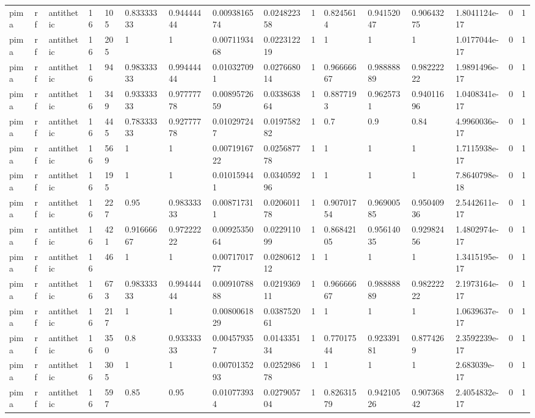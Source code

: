 \begin{tabular}{llllllllllllllll}
pima & rf & antithetic & 16 & 105 & 0.83333333 & 0.94444444 & 0.0093816574 & 0.024822358 & 1 & 0.8245614 & 0.94152047 & 0.90643275 & 1.8041124e-17 & 0 & 1 \\
pima & rf & antithetic & 16 & 205 & 1 & 1 & 0.0071193468 & 0.022312219 & 1 & 1 & 1 & 1 & 1.0177044e-17 & 0 & 1 \\
pima & rf & antithetic & 16 & 94 & 0.98333333 & 0.99444444 & 0.010327091 & 0.027668014 & 1 & 0.96666667 & 0.98888889 & 0.98222222 & 1.9891496e-17 & 0 & 1 \\
pima & rf & antithetic & 16 & 349 & 0.93333333 & 0.97777778 & 0.0089572659 & 0.033863864 & 1 & 0.8877193 & 0.9625731 & 0.94011696 & 1.0408341e-17 & 0 & 1 \\
pima & rf & antithetic & 16 & 445 & 0.78333333 & 0.92777778 & 0.010297247 & 0.019758282 & 1 & 0.7 & 0.9 & 0.84 & 4.9960036e-17 & 0 & 1 \\
pima & rf & antithetic & 16 & 569 & 1 & 1 & 0.0071916722 & 0.025687778 & 1 & 1 & 1 & 1 & 1.7115938e-17 & 0 & 1 \\
pima & rf & antithetic & 16 & 195 & 1 & 1 & 0.010159441 & 0.034059296 & 1 & 1 & 1 & 1 & 7.8640798e-18 & 0 & 1 \\
pima & rf & antithetic & 16 & 227 & 0.95 & 0.98333333 & 0.008717311 & 0.020601178 & 1 & 0.90701754 & 0.96900585 & 0.95040936 & 2.5442611e-17 & 0 & 1 \\
pima & rf & antithetic & 16 & 421 & 0.91666667 & 0.97222222 & 0.0092535064 & 0.022911099 & 1 & 0.86842105 & 0.95614035 & 0.92982456 & 1.4802974e-17 & 0 & 1 \\
pima & rf & antithetic & 16 & 46 & 1 & 1 & 0.0071701777 & 0.028061212 & 1 & 1 & 1 & 1 & 1.3415195e-17 & 0 & 1 \\
pima & rf & antithetic & 16 & 673 & 0.98333333 & 0.99444444 & 0.0091078888 & 0.021936911 & 1 & 0.96666667 & 0.98888889 & 0.98222222 & 2.1973164e-17 & 0 & 1 \\
pima & rf & antithetic & 16 & 217 & 1 & 1 & 0.0080061829 & 0.038752061 & 1 & 1 & 1 & 1 & 1.0639637e-17 & 0 & 1 \\
pima & rf & antithetic & 16 & 350 & 0.8 & 0.93333333 & 0.004579357 & 0.014335134 & 1 & 0.77017544 & 0.92339181 & 0.8774269 & 2.3592239e-17 & 0 & 1 \\
pima & rf & antithetic & 16 & 305 & 1 & 1 & 0.0070135293 & 0.025298678 & 1 & 1 & 1 & 1 & 2.683039e-17 & 0 & 1 \\
pima & rf & antithetic & 16 & 597 & 0.85 & 0.95 & 0.010773934 & 0.027905704 & 1 & 0.82631579 & 0.94210526 & 0.90736842 & 2.4054832e-17 & 0 & 1 \\

\end{tabular}
